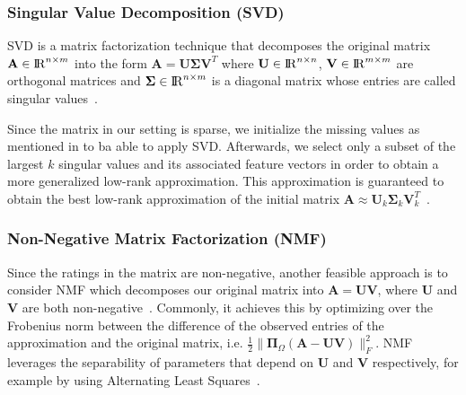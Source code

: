 \documentclass[10pt,conference,compsocconf]{IEEEtran}
\begin{document}
    \subsubsection{Singular Value Decomposition (SVD)}

    SVD is a matrix factorization technique that decomposes the original matrix $\mathbf{A} \in {\rm I\!R}^{n \times m} $ into the form $ \mathbf{A} = \mathbf{U \Sigma V}^T $ where $\mathbf{U} \in {\rm I\!R}^{n \times n}$,  $\mathbf{V}  \in {\rm I\!R}^{m \times m}$ are orthogonal matrices and $\mathbf{\Sigma} \in {\rm I\!R}^{n \times m}$ is a diagonal matrix whose entries are called singular values~\cite{svd}.

    Since the matrix in our setting is sparse, we initialize the missing values as mentioned in  to ba able to apply SVD.
    Afterwards, we select only a subset of the largest $k$ singular values and its associated feature vectors in order to obtain a more generalized low-rank approximation.
    This approximation is guaranteed to obtain the best low-rank approximation of the initial matrix $\mathbf{A}\approx \mathbf{U}_k \mathbf{\Sigma}_k \mathbf{V}^T_k$~\cite{Eckart1936}.

    \subsubsection{Non-Negative Matrix Factorization (NMF)}

    Since the ratings in the matrix are non-negative, another feasible approach is to consider NMF which decomposes our original matrix into $\mathbf{A} = \mathbf{UV}$, where $\mathbf{U}$ and $\mathbf{V}$ are both non-negative~\cite{gillis2014nonnegative}.
    Commonly, it achieves this by optimizing over the Frobenius norm between the difference of the observed entries of the approximation and the original matrix, i.e. $ \frac{1}{2}\|\mathbf{\Pi}_{\Omega}(\mathbf{A} - \mathbf{UV})\|^2_F$.
    NMF leverages the separability of parameters that depend on $\mathbf{U}$ and $\mathbf{V}$ respectively, for example by using Alternating Least Squares~\cite{als}.
\end{document}
